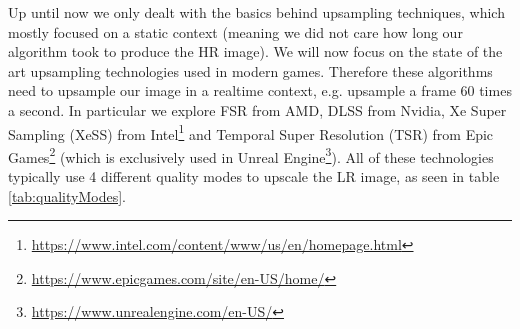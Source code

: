 \documentclass[letterpaper, 10 pt, conference]{ieeeconf}  %
\begin{document}
Up until now we only dealt with the basics behind upsampling techniques, which mostly focused on a static context (meaning we did not care how long our algorithm took to produce the HR image).
We will now focus on the state of the art upsampling technologies used in modern games. Therefore these algorithms need to upsample our image in a realtime context, e.g. upsample a frame 60 times a second.
In particular we explore FSR from AMD, DLSS from Nvidia, 
Xe Super Sampling (XeSS) \cite{XeSS_intro} from Intel\footnote{\url{https://www.intel.com/content/www/us/en/homepage.html}} 
and Temporal Super Resolution (TSR) \cite{TSR_intro} from Epic Games\footnote{\url{https://www.epicgames.com/site/en-US/home/}} (which is exclusively used in Unreal Engine\footnote{\url{https://www.unrealengine.com/en-US/}}).
All of these technologies typically use 4 different quality modes to upscale the LR image, as seen in table \ref{tab:qualityModes}.
\end{document}
